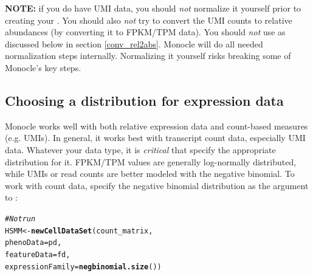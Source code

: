 \documentclass[10pt,oneside]{article}\usepackage[]{graphicx}\usepackage[]{color}
\makeatletter
\newcommand{\hlcom}[1]{\textcolor[rgb]{0.678,0.584,0.686}{\textit{#1}}}%
\newcommand{\hlstd}[1]{\textcolor[rgb]{0.345,0.345,0.345}{#1}}%
\newcommand{\hlkwb}[1]{\textcolor[rgb]{0.69,0.353,0.396}{#1}}%
\newcommand{\hlkwc}[1]{\textcolor[rgb]{0.333,0.667,0.333}{#1}}%
\newcommand{\hlkwd}[1]{\textcolor[rgb]{0.737,0.353,0.396}{\textbf{#1}}}%
\newenvironment{kframe}{%
 \def\at@end@of@kframe{}%
 \ifinner\ifhmode%
  \def\at@end@of@kframe{\end{minipage}}%
  \begin{minipage}{\columnwidth}%
 \fi\fi%
 \def\FrameCommand##1{\hskip\@totalleftmargin \hskip-\fboxsep
 \colorbox{shadecolor}{##1}\hskip-\fboxsep
     \hskip-\linewidth \hskip-\@totalleftmargin \hskip\columnwidth}%
 \MakeFramed {\advance\hsize-\width
   \@totalleftmargin\z@ \linewidth\hsize
   \@setminipage}}%
 {\par\unskip\endMakeFramed%
 \at@end@of@kframe}
\newenvironment{knitrout}{}{} %
\makeatother
\begin{document}
\textbf{NOTE:} if you do have UMI data, you should \emph{not} normalize it yourself prior to creating your . You should also \emph{not} try to convert the UMI counts to relative abundances (by converting it to FPKM/TPM data). You should \emph{not} use  as discussed below in section \ref{conv_rel2abs}. Monocle will do all needed normalization steps internally. Normalizing it yourself risks breaking some of Monocle's key steps.
 
\subsection{Choosing a distribution for expression data}
 
Monocle works well with both relative expression data and count-based measures (e.g. UMIs). In general, it works best with transcript count data, especially UMI data. Whatever your data type, it is \emph{critical} that specify the appropriate distribution for it. FPKM/TPM values are generally log-normally distributed, while UMIs or read counts are better modeled with the negative binomial. To work with count data, specify the negative binomial distribution as the  argument to : 
 
\begin{knitrout}
\color{fgcolor}\begin{kframe}
\begin{alltt}
\hlcom{# Not run}
\hlstd{HSMM} \hlkwb{<-} \hlkwd{newCellDataSet}\hlstd{(count_matrix,}
                       \hlkwc{phenoData} \hlstd{= pd,}
                       \hlkwc{featureData} \hlstd{= fd,}
                       \hlkwc{expressionFamily}\hlstd{=}\hlkwd{negbinomial.size}\hlstd{())}
\end{alltt}
\end{kframe}
\end{knitrout}
 
\end{document}
